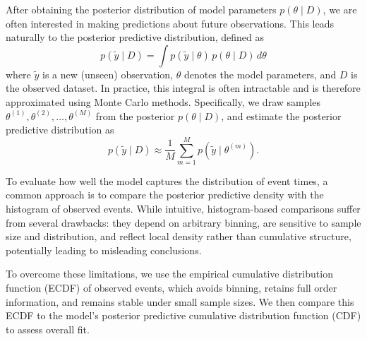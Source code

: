 
After obtaining the posterior distribution of model parameters $p(\theta \mid D)$, we are often interested in making predictions about future observations. This leads naturally to the posterior predictive distribution, defined as
\begin{equation}
    p(\tilde{y} \mid D) = \int p(\tilde{y} \mid \theta)\, p(\theta \mid D)\, d\theta
    \label{eq:18}
\end{equation}
where $\tilde{y}$ is a new (unseen) observation, $\theta$ denotes the model parameters, and $D$ is the observed dataset. In practice, this integral is often intractable and is therefore approximated using Monte Carlo methods. Specifically, we draw samples $\theta^{(1)}, \theta^{(2)}, \dots, \theta^{(M)}$ from the posterior $p(\theta \mid D)$, and estimate the posterior predictive distribution as
\begin{equation}
p(\tilde{y} \mid D) \approx \frac{1}{M} \sum_{m=1}^{M} p(\tilde{y} \mid \theta^{(m)}).
\end{equation}




To evaluate how well the model captures the distribution of event times, a common approach is to compare the posterior predictive density with the histogram of observed events. While intuitive, histogram-based comparisons suffer from several drawbacks: they depend on arbitrary binning, are sensitive to sample size and distribution, and reflect local density rather than cumulative structure, potentially leading to misleading conclusions.

To overcome these limitations, we use the empirical cumulative distribution function (ECDF) of observed events, which avoids binning, retains full order information, and remains stable under small sample sizes. We then compare this ECDF to the model’s posterior predictive cumulative distribution function (CDF) to assess overall fit.


